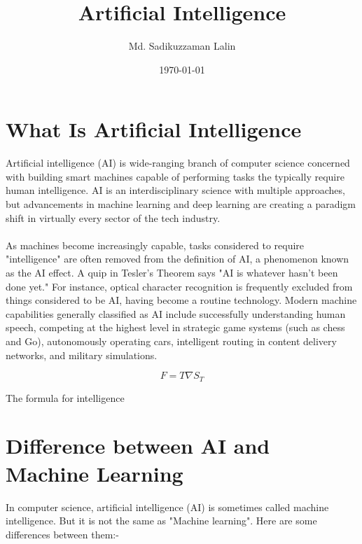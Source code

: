 \documentclass[a4paper, 12pt]{article}
\begin{document}
\title{\Large{\textbf{Artificial Intelligence}}}
\author{Md. Sadikuzzaman Lalin}
\date{\today}
\maketitle

\tableofcontents

\section{What Is Artificial Intelligence}
Artificial intelligence (AI) is wide-ranging branch of computer science concerned with building smart machines capable of performing tasks the typically require human intelligence. AI is an interdisciplinary science with multiple approaches, but advancements in machine learning and deep learning are creating a paradigm shift in virtually every sector of the tech industry.\\ \\
As machines become increasingly capable, tasks considered to require "intelligence" are often removed from the definition of AI, a phenomenon known as the AI effect. A quip in Tesler's Theorem says "AI is whatever hasn't been done yet." For instance, optical character recognition is frequently excluded from things considered to be AI, having become a routine technology. Modern machine capabilities generally classified as AI include successfully understanding human speech, competing at the highest level in strategic game systems (such as chess and Go), autonomously operating cars, intelligent routing in content delivery networks, and military simulations.

$$F = T \nabla S_T$$
\begin{center} The formula for intelligence \end{center}

\section{Difference between AI and Machine Learning}
In computer science, artificial intelligence (AI) is sometimes called machine intelligence. But it is not the same as "Machine learning". Here are some differences between them:-
\end{document}
